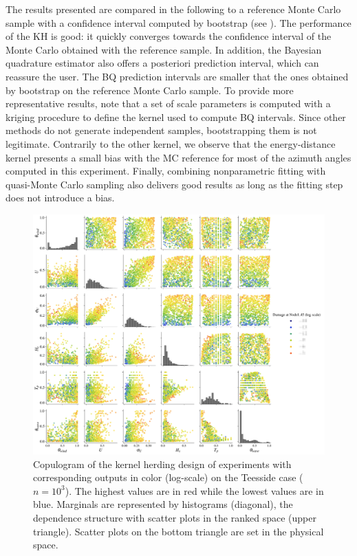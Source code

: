 The results presented are compared in the following to a reference Monte Carlo sample with a confidence interval computed by bootstrap (see ). 
The performance of the KH is good: it quickly converges towards the confidence interval of the Monte Carlo obtained with the reference sample. 
In addition, the Bayesian quadrature estimator also offers a posteriori prediction interval, which can reassure the user. 
The BQ prediction intervals are smaller that the ones obtained by bootstrap on the reference Monte Carlo sample. 
To provide more representative results, note that a set of scale parameters is computed with a kriging procedure to define the kernel used to compute BQ intervals. 
Since other methods do not generate independent samples, bootstrapping them is not legitimate. 
Contrarily to the other kernel, we observe that the energy-distance kernel presents a small bias with the MC reference for most of the azimuth angles computed in this experiment. 
Finally, combining nonparametric fitting with quasi-Monte Carlo sampling also delivers good results as long as the fitting step does not introduce a bias. 


\begin{figure}[!h]
\begin{center}
    \includegraphics[width=\textwidth]{part2/figures/DCE/teesside/kh_output_pairplot.jpg}
\end{center}
\caption{Copulogram of the kernel herding design of experiments with corresponding outputs in color (log-scale) on the Teesside case ($n = 10^3$). 
The highest values are in red while the lowest values are in blue. 
Marginals are represented by histograms (diagonal), the dependence structure with scatter plots in the ranked space (upper triangle). 
Scatter plots on the bottom triangle are set in the physical space.} \label{fig:pairplot_kh_teesside}
\end{figure}


